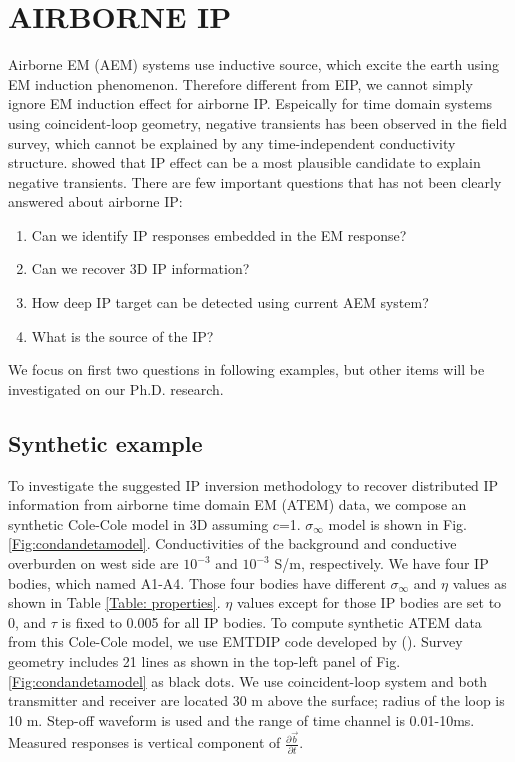 \documentclass[letterpaper,11pt]{article}
\newcommand{\siginf}{\sigma_\infty}
\renewcommand {\b}  { {\vec b} }
\newcommand{\dbdt}{\frac{\partial \b}{\partial t}}
\begin{document}
\section{AIRBORNE IP}
Airborne EM (AEM) systems use inductive source, which excite the earth using EM induction phenomenon. Therefore different from EIP, we cannot simply ignore EM induction effect for airborne IP. Espeically for time domain systems using coincident-loop geometry, negative transients has been observed in the field survey, which cannot be explained by any time-independent conductivity structure. \cite[]{Weidelt1982} showed that IP effect can be a most plausible candidate to explain negative transients. There are few important questions that has not been clearly answered about airborne IP:
\begin{enumerate}
  \item Can we identify IP responses embedded in the EM response?
  \item Can we recover 3D IP information?
  \item How deep IP target can be detected using current AEM system?
  \item What is the source of the IP?  
\end{enumerate}
We focus on first two questions in following examples, but other items will be investigated on our Ph.D. research. 
\subsection{Synthetic example}
To investigate the suggested IP inversion methodology to recover distributed IP information from airborne time domain EM (ATEM) data, we compose an synthetic Cole-Cole model in 3D assuming $c$=1. $\siginf$ model is shown in Fig. \ref{Fig:condandetamodel}. Conductivities of the background and conductive overburden on west side are $10^{-3}$ and $10^{-3}$ S/m, respectively. We have four IP bodies, which named A1-A4. Those four bodies have different $\siginf$ and $\eta$ values as shown in Table \ref{Table: properties}. $\eta$ values except for those IP bodies are set to 0, and $\tau$ is fixed to 0.005 for all IP bodies. To compute synthetic ATEM data from this Cole-Cole model, we use EMTDIP code developed by (\cite{Marchant2014}). Survey geometry includes 21 lines as shown in the top-left panel of Fig. \ref{Fig:condandetamodel} as black dots. We use coincident-loop system and both transmitter and receiver are located 30 m above the surface; radius of the loop is 10 m. Step-off waveform is used and the range of time channel is 0.01-10ms. Measured responses is vertical component of $\dbdt$. 
\end{document}
